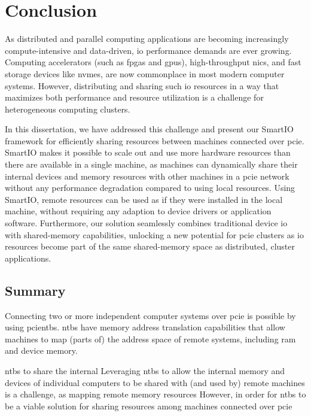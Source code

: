 \chapter{Conclusion}\label{chapter:conclusion}
As distributed and parallel computing applications are becoming increasingly compute-intensive and data-driven, \gls{io} performance demands are ever growing.
%
Computing accelerators (such as \glspl{fpga} and \glspl{gpu}), high-throughput \glspl{nic}, and fast storage devices like \glspl{nvme}, are now commonplace in most modern computer systems.
%
However, distributing and sharing such \gls{io} resources in a way that maximizes both performance and resource utilization is a challenge for heterogeneous computing clusters.



In this dissertation, we have addressed this challenge and present our SmartIO framework for efficiently sharing resources between machines connected over \gls{pcie}.
%
SmartIO makes it possible to scale out and use more hardware resources than there are available in a single machine, as machines can dynamically share their internal devices and memory resources with other machines in a \gls{pcie} network without any performance degradation compared to using local resources.
%
Using SmartIO, remote resources can be used as if they were installed in the local machine, without requiring any adaption to device drivers or application software.
%
Furthermore, our solution seamlessly combines traditional device \gls{io} with shared-memory capabilities, unlocking a new potential for \gls{pcie} clusters as \gls{io} resources become part of the same shared-memory space as distributed, cluster applications.




\section{Summary}
Connecting two or more independent computer systems over \gls{pcie} is possible by using \glspl{pcientb}.
%
\Glspl{ntb} have memory address translation capabilities that allow machines to map (parts of) the address space of remote systems, including \gls{ram} and device memory.
%



\glspl{ntb} to share the internal
Leveraging \glspl{ntb} to allow the internal memory and devices of individual computers to be shared with (and used by) remote machines is a challenge, as mapping remote memory resources 
%
However, in order for \glspl{ntb} to be a viable solution for sharing resources among machines connected over \gls{pcie}


